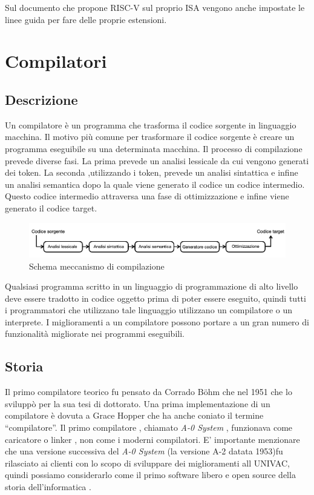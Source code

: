 \documentclass[12pt,a4paper]{report}
\begin{document}
Sul documento che propone RISC-V sul proprio ISA vengono anche impostate le linee guida per fare delle proprie estensioni.



\chapter{Compilatori}

\section{Descrizione}
Un compilatore è un programma che trasforma il codice sorgente in linguaggio macchina. Il motivo più comune per trasformare il codice sorgente è creare un programma eseguibile su una determinata macchina. Il processo di compilazione prevede diverse fasi. La prima prevede un analisi lessicale da cui vengono generati dei token. La seconda ,utilizzando i token, prevede un analisi sintattica e infine un analisi semantica dopo la quale viene generato il codice un codice intermedio. Questo codice intermedio attraversa una fase di ottimizzazione e infine viene generato il codice target.


\begin{figure}
\includegraphics[width = \textwidth]{SchemaCompilatore.png}
\caption{Schema meccanismo di compilazione}
\label{Fig:MeccanismoCompilazione}
\end{figure}%


Qualsiasi programma scritto in un linguaggio di programmazione di alto livello deve essere tradotto in codice oggetto prima di poter essere eseguito, quindi tutti i programmatori che utilizzano tale linguaggio utilizzano un compilatore o un interprete. I miglioramenti a un compilatore possono portare a un gran numero di funzionalità migliorate nei programmi eseguibili.

\section{Storia}
Il primo compilatore teorico fu pensato da Corrado Böhm che nel 1951 che lo sviluppò per la sua tesi di dottorato.  Una  prima implementazione di un compilatore è dovuta a Grace Hopper  che ha anche coniato il termine ``compilatore''.  Il primo compilatore , chiamato \textit{A-0 System} ,  funzionava come caricatore o linker , non come i moderni compilatori. E' importante menzionare che una versione successiva del \textit{A-0 System} (la versione A-2 datata 1953)fu rilasciato ai clienti con lo scopo di sviluppare dei miglioramenti all UNIVAC, quindi possiamo considerarlo come il primo software libero e open source della storia dell'informatica \cite{SystemA0}.
\end{document}
